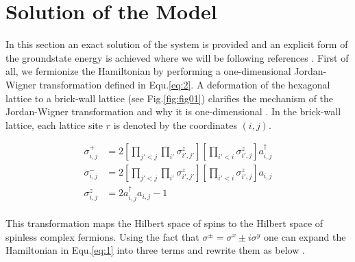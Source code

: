 \documentclass{article}
\begin{document}




\section{Solution of the Model}\label{sec2}

In this section an exact solution of the system is provided and an explicit form of the groundstate energy is achieved where we will be following references \cite{Kitaev_2006,pachos_2012,Schmoll_2017}. First of all, we fermionize the Hamiltonian by performing a one-dimensional Jordan-Wigner transformation \cite{Jordan:1928wi} defined in Equ.\hspace{0.2mm}\ref{eq:2}. A deformation of the hexagonal lattice to a brick-wall lattice (see Fig.\hspace{0.2mm}\ref{fig:fig01})  clarifies the mechanism of the Jordan-Wigner transformation and why it is one-dimensional \cite{Chen_2008}. In the brick-wall lattice, each lattice site $r$ is denoted by the coordinates $(i,j)$.

\begin{equation}\label{eq:2}
	\begin{aligned}
		\sigma^{+}_{i,j} &= 2[\prod_{j'<j}\prod_{i'}\sigma^{z}_{i',j'}][\prod_{i'<i}\sigma^z_{i',j}] a^{\dagger}_{i,j}\\
		\sigma^{-}_{i,j} &= 2[\prod_{j'<j}\prod_{i'}\sigma^{z}_{i',j'}][\prod_{i'<i}\sigma^z_{i',j}] a_{i,j}\\
		\sigma^{z}_{i,j} &= 2a^{\dagger}_{i,j}a_{i,j} - 1
	\end{aligned}
\end{equation}\\

\noindent This transformation maps the Hilbert space of spins to the Hilbert space of spinless complex fermions. Using the fact that $ \sigma^{\pm} = \sigma^{x}\pm i\sigma^{y} $ one can expand the Hamiltonian in Equ.\hspace{0.2mm}\ref{eq:1} into three terms and rewrite them as below \cite{Schmoll_2017}.
\end{document}
